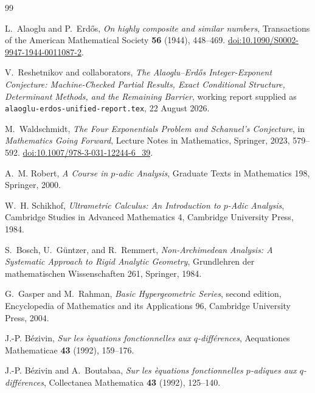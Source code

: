 \documentclass[11pt,oneside]{article}
\theoremstyle{definition}
\begin{document}
\begin{thebibliography}{99}
\small

L.~Alaoglu and P.~Erd\H{o}s,
\newblock \emph{On highly composite and similar numbers},
\newblock Transactions of the American Mathematical Society \textbf{56} (1944), 448--469.
\newblock \href{https://doi.org/10.1090/S0002-9947-1944-0011087-2}{doi:10.1090/S0002-9947-1944-0011087-2}.

V.~Reshetnikov and collaborators,
\newblock \emph{The Alaoglu--Erd\H{o}s Integer-Exponent Conjecture: Machine-Checked Partial Results, Exact Conditional Structure, Determinant Methods, and the Remaining Barrier},
\newblock working report supplied as \texttt{alaoglu-erdos-unified-report.tex}, 22 August 2026.

M.~Waldschmidt,
\newblock \emph{The Four Exponentials Problem and Schanuel's Conjecture},
\newblock in \emph{Mathematics Going Forward}, Lecture Notes in Mathematics, Springer, 2023,
579--592.
\newblock \href{https://doi.org/10.1007/978-3-031-12244-6_39}{doi:10.1007/978-3-031-12244-6\_39}.

A.~M. Robert,
\newblock \emph{A Course in $p$-adic Analysis},
\newblock Graduate Texts in Mathematics 198, Springer, 2000.

W.~H. Schikhof,
\newblock \emph{Ultrametric Calculus: An Introduction to $p$-Adic Analysis},
\newblock Cambridge Studies in Advanced Mathematics 4, Cambridge University Press, 1984.

S.~Bosch, U.~G\"untzer, and R.~Remmert,
\newblock \emph{Non-Archimedean Analysis: A Systematic Approach to Rigid Analytic Geometry},
\newblock Grundlehren der mathematischen Wissenschaften 261, Springer, 1984.

G.~Gasper and M.~Rahman,
\newblock \emph{Basic Hypergeometric Series}, second edition,
\newblock Encyclopedia of Mathematics and its Applications 96, Cambridge University Press, 2004.

J.-P. B\'ezivin,
\newblock \emph{Sur les \`equations fonctionnelles aux $q$-diff\'erences},
\newblock Aequationes Mathematicae \textbf{43} (1992), 159--176.

J.-P. B\'ezivin and A.~Boutabaa,
\newblock \emph{Sur les \`equations fonctionnelles $p$-adiques aux $q$-diff\'erences},
\newblock Collectanea Mathematica \textbf{43} (1992), 125--140.


\end{thebibliography}
\end{document}
